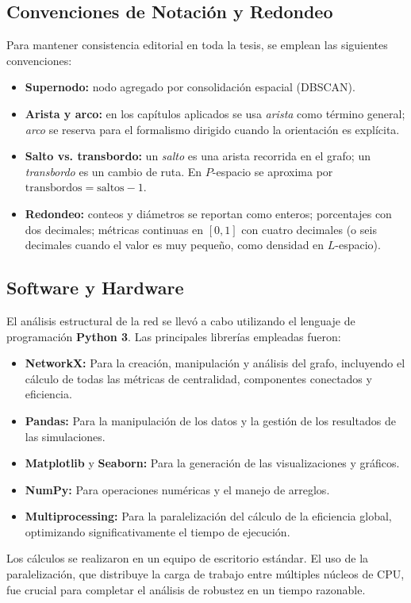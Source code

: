         \subsection{Convenciones de Notación y Redondeo}
            Para mantener consistencia editorial en toda la tesis, se emplean las siguientes convenciones:
            \begin{itemize}
                \item \textbf{Supernodo:} nodo agregado por consolidación espacial (DBSCAN).
                \item \textbf{Arista y arco:} en los capítulos aplicados se usa \emph{arista} como término general; \emph{arco} se reserva para el formalismo dirigido cuando la orientación es explícita.
                \item \textbf{Salto vs. transbordo:} un \emph{salto} es una arista recorrida en el grafo; un \emph{transbordo} es un cambio de ruta. En \(P\)-espacio se aproxima por \(\text{transbordos}=\text{saltos}-1\).
                \item \textbf{Redondeo:} conteos y diámetros se reportan como enteros; porcentajes con dos decimales; métricas continuas en \([0,1]\) con cuatro decimales (o seis decimales cuando el valor es muy pequeño, como densidad en \(L\)-espacio).
            \end{itemize}

        \subsection{Software y Hardware}

            El análisis estructural de la red se llevó a cabo utilizando el lenguaje de programación \textbf{Python 3}. Las principales librerías empleadas fueron:
            \begin{itemize}
                \item \textbf{NetworkX:} Para la creación, manipulación y análisis del grafo, incluyendo el cálculo de todas las métricas de centralidad, componentes conectados y eficiencia.
                \item \textbf{Pandas:} Para la manipulación de los datos y la gestión de los resultados de las simulaciones.
                \item \textbf{Matplotlib} y \textbf{Seaborn:} Para la generación de las visualizaciones y gráficos.
                \item \textbf{NumPy:} Para operaciones numéricas y el manejo de arreglos.
                \item \textbf{Multiprocessing:} Para la paralelización del cálculo de la eficiencia global, optimizando significativamente el tiempo de ejecución.
            \end{itemize}
            Los cálculos se realizaron en un equipo de escritorio estándar. El uso de la paralelización, que distribuye la carga de trabajo entre múltiples núcleos de CPU, fue crucial para completar el análisis de robustez en un tiempo razonable.

